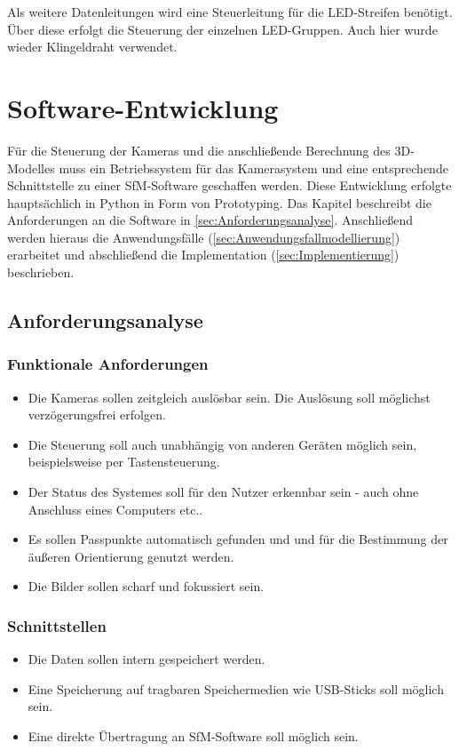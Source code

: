 \documentclass[a4paper,12pt,bibliography=totoc, listof=totoc,titlepage]{scrreprt}
\begin{document}
Als weitere Datenleitungen wird eine Steuerleitung für die LED-Streifen benötigt. Über diese erfolgt die Steuerung der einzelnen LED-Gruppen. Auch hier wurde wieder Klingeldraht verwendet.

\chapter {Software-Entwicklung}
Für die Steuerung der Kameras und die anschließende Berechnung des 3D-Modelles muss ein Betriebssystem für das Kamerasystem und eine entsprechende Schnittstelle zu einer SfM-Software geschaffen werden. Diese Entwicklung erfolgte hauptsächlich in Python in Form von Prototyping. Das Kapitel beschreibt die Anforderungen an die Software in \autoref{sec:Anforderungsanalyse}. Anschließend werden hieraus die Anwendungsfälle (\autoref{sec:Anwendungsfallmodellierung}) erarbeitet und abschließend die Implementation (\autoref{sec:Implementierung}) beschrieben.

\section{Anforderungsanalyse}
\label{sec:Anforderungsanalyse}

\subsection{Funktionale Anforderungen}
\begin{itemize}
    \item Die Kameras sollen zeitgleich auslösbar sein. Die Auslösung soll möglichst ver\-zögerungs\-frei erfolgen.
    \item Die Steuerung soll auch unabhängig von anderen Geräten möglich sein, beispielsweise per Tastensteuerung.
    \item Der Status des Systemes soll für den Nutzer erkennbar sein - auch ohne Anschluss eines Computers etc..
    \item Es sollen Passpunkte automatisch gefunden und und für die Bestimmung der äußeren Orientierung genutzt werden.
    \item Die Bilder sollen scharf und fokussiert sein.
\end{itemize}

\subsection{Schnittstellen}
\begin{itemize}
    \item Die Daten sollen intern gespeichert werden.
    \item Eine Speicherung auf tragbaren Speichermedien wie USB-Sticks soll möglich sein.
    \item Eine direkte Übertragung an SfM-Software soll möglich sein.
\end{itemize}
\end{document}
